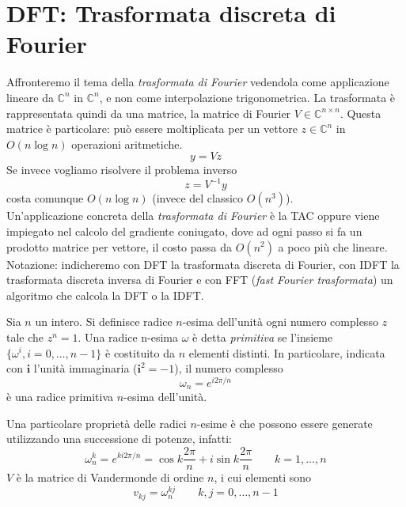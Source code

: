 

\inbpdocument 


\chapter{DFT: Trasformata discreta di Fourier}
Affronteremo il tema della \emph{trasformata di Fourier} vedendola come applicazione lineare da $\mathbb{C}^{n}$ in $\mathbb{C}^{n}$, e non come interpolazione trigonometrica. La trasformata \`e rappresentata
quindi da una matrice, la matrice di Fourier $V \in \mathbb{C}^{n
\times n}$. Questa matrice \`e particolare: può essere
moltiplicata per un vettore $z \in \mathbb{C}^{n}$ in $O(n \log n)$
operazioni aritmetiche.
$$ y = Vz$$
Se invece vogliamo risolvere il problema inverso
$$z = V^{-1}y$$
costa comunque $O(n \log n)$ (invece del classico $O(n^3)$). \\
Un'applicazione concreta della \emph{trasformata di Fourier} \`e la TAC oppure viene impiegato nel calcolo del gradiente coniugato,
dove ad ogni passo si fa un prodotto matrice per vettore, il costo passa
da $O(n^2)$ a poco più che lineare.\\ 
Notazione: indicheremo con DFT la trasformata discreta di Fourier, con IDFT la trasformata discreta inversa di Fourier e con FFT (\emph{fast Fourier trasformata}) un algoritmo che calcola la DFT o la IDFT.

\begin{defn}
Sia $n$ un intero. Si definisce radice $n$-esima dell'unit\`a
ogni numero complesso $z$ tale che $z^{n} = 1$. Una radice n-esima $\omega$ \`e detta
\emph{primitiva} se l'insieme $\{\omega^{i} , i = 0, \ldots , n-1\}$ \`e costituito da 
$n$ elementi distinti. In particolare, indicata con $\mathbf{i}$ l’unit\`a immaginaria ($\mathbf{i}^2 = −1$),
 il numero complesso
$$\omega_n= e^{i 2\pi/n}$$
\`e una radice primitiva $n$-esima dell'unit\`a.
\end{defn}

Una particolare propriet\`a delle radici $n$-esime \`e che possono
essere generate utilizzando una successione di potenze, infatti:
$$
\omega^{k}_{n} = e^{ki 2\pi / n} = \cos k \frac{2\pi}{n} + i \sin k
\frac{2\pi}{n} \qquad k=1, \ldots, n
$$
$V$ \`e la matrice di Vandermonde di ordine $n$, i cui elementi sono
$$ v_{kj} = \omega_{n}^{kj} \qquad k,j = 0, \ldots, n-1 $$


